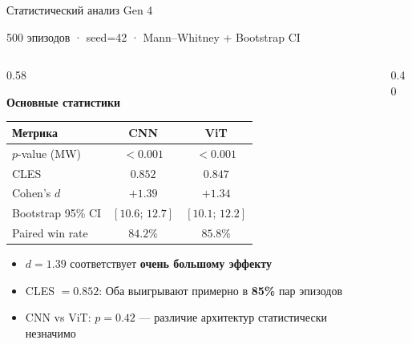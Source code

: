 \documentclass[aspectratio=169]{beamer}
\begin{document}
\begin{frame}{Статистический анализ Gen 4}
	
	\footnotesize
	500 эпизодов · seed=42 · Mann--Whitney + Bootstrap CI
	
	\vspace{0.7em}
	
	\begin{columns}[T,onlytextwidth]
		
		\begin{column}{0.58\textwidth}
			
			\textbf{Основные статистики}
			
			\smallskip
			
			\scriptsize
			\setlength{\tabcolsep}{5pt}
			\renewcommand{\arraystretch}{1.18}
			
			\begin{tabular}{@{}lcc@{}}
				\toprule
				\rowcolor{ThemeGridStroke}
				\color{ThemeCellFilled}\textbf{Метрика} &
				\color{ThemeCellFilled}\textbf{CNN} &
				\color{ThemeCellFilled}\textbf{ViT} \\
				\midrule
				$p$-value (MW)           & $<0.001$            & $<0.001$ \\
				CLES                     & $0.852$             & $0.847$ \\
				Cohen's $d$              & $\mathbf{+1.39}$    & $\mathbf{+1.34}$ \\
				Bootstrap 95\% CI        & $[10.6;\,12.7]$     & $[10.1;\,12.2]$ \\
				Paired win rate          & $84.2\%$            & $85.8\%$ \\
				\bottomrule
			\end{tabular}
			
			\normalsize
			\medskip
			
			\begin{itemize}
				\item $d=1.39$ соответствует \textbf{очень большому эффекту}
				\item CLES $=0.852$: Оба выигрывают примерно в \textbf{85\%} пар эпизодов
				\item CNN vs ViT: $p=0.42$ — различие архитектур статистически незначимо
			\end{itemize}
			
		\end{column}
		
		\begin{column}{0.40\textwidth}
			

\end{column}
\end{columns}
\end{frame}
\end{document}
